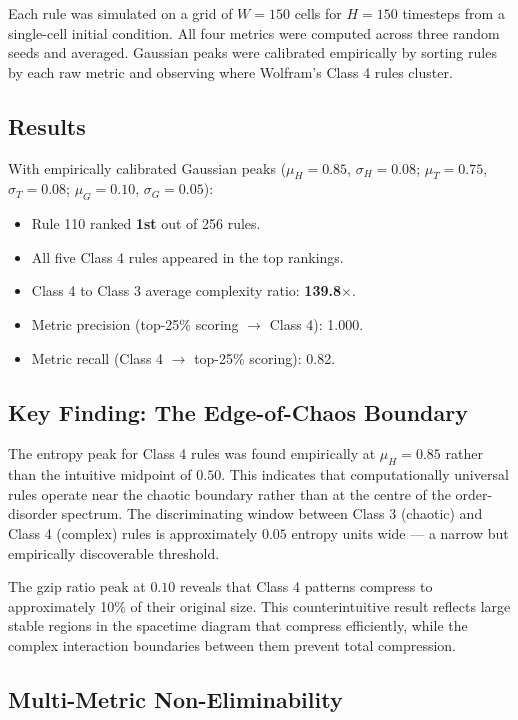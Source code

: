 \documentclass[12pt,a4paper]{article}
\begin{document}
Each rule was simulated on a grid of $W = 150$ cells for $H = 150$
timesteps from a single-cell initial condition.
All four metrics were computed across three random seeds and averaged.
Gaussian peaks were calibrated empirically by sorting rules by each raw
metric and observing where Wolfram's Class 4 rules cluster.

\subsection{Results}

With empirically calibrated Gaussian peaks
($\mu_H = 0.85$, $\sigma_H = 0.08$; $\mu_T = 0.75$, $\sigma_T = 0.08$;
$\mu_G = 0.10$, $\sigma_G = 0.05$):

\begin{itemize}[noitemsep]
  \item Rule 110 ranked \textbf{1st} out of 256 rules.
  \item All five Class 4 rules appeared in the top rankings.
  \item Class 4 to Class 3 average complexity ratio: \textbf{139.8$\times$}.
  \item Metric precision (top-25\% scoring $\rightarrow$ Class 4): 1.000.
  \item Metric recall (Class 4 $\rightarrow$ top-25\% scoring): 0.82.
\end{itemize}

\subsection{Key Finding: The Edge-of-Chaos Boundary}

The entropy peak for Class 4 rules was found empirically at $\mu_H = 0.85$
rather than the intuitive midpoint of $0.50$.
This indicates that computationally universal rules operate near the
chaotic boundary rather than at the centre of the order-disorder spectrum.
The discriminating window between Class 3 (chaotic) and Class 4 (complex)
rules is approximately $0.05$ entropy units wide — a narrow but
empirically discoverable threshold.

The gzip ratio peak at $0.10$ reveals that Class 4 patterns compress to
approximately 10\% of their original size.
This counterintuitive result reflects large stable regions in the
spacetime diagram that compress efficiently, while the complex interaction
boundaries between them prevent total compression.

\subsection{Multi-Metric Non-Eliminability}
\end{document}
